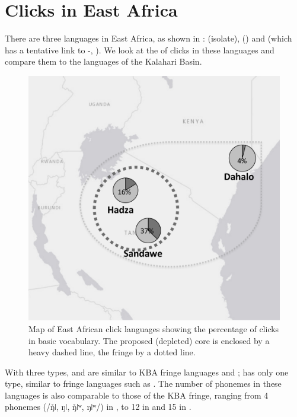 \documentclass[output=paper,newtxmath,modfonts,nonflat,draftmode]{langsci/langscibook}
\begin{document}
\section{Clicks in East Africa}\label{sec:sands:6}

There are three  languages in East Africa, as shown in :  (isolate),  () and  (which has a tentative link to -, \citealt{Güldemann2010}). We look at the  of clicks in these languages and compare them to the languages of the Kalahari Basin. 


\begin{figure}
\includegraphics[height=.35\textheight]{figures/sands-fig6.png}
\caption{Map of East African click languages showing the percentage of clicks in basic vocabulary. The proposed (depleted) core is enclosed by a heavy dashed line, the fringe by a dotted line.}
\label{fig:sands:6}
\end{figure}

With three  types,  and  are similar to KBA fringe languages  and ;  has only one  type, similar to fringe languages such as . The number of  phonemes in these languages is also comparable to those of the KBA fringe, ranging from 4 phonemes (/ŋ̊ǀ, ŋǀ, ŋ̊ǀʷ, ŋǀʷ/) in  \citep{Maddieson1993}, to 12 in  \citep{Miller2012} and 15 in  \citep{Elderkin2013,hunziker2008}. 
\end{document}
